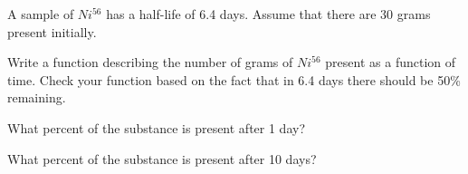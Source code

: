 \begin{activity}\label{A:0.2.2}
    A sample of $Ni^{56}$ has a half-life of 6.4 days.  Assume that there are 30 grams
    present initially.
    \ba
        \item Write a function describing the number of grams of $Ni^{56}$ present as a
            function of time.  Check your function based on the fact that in 6.4 days
            there should be 50\% remaining.
        \item What percent of the substance is present after 1 day?
        \item What percent of the substance is present after 10 days?
    \ea
\end{activity}\aftera
